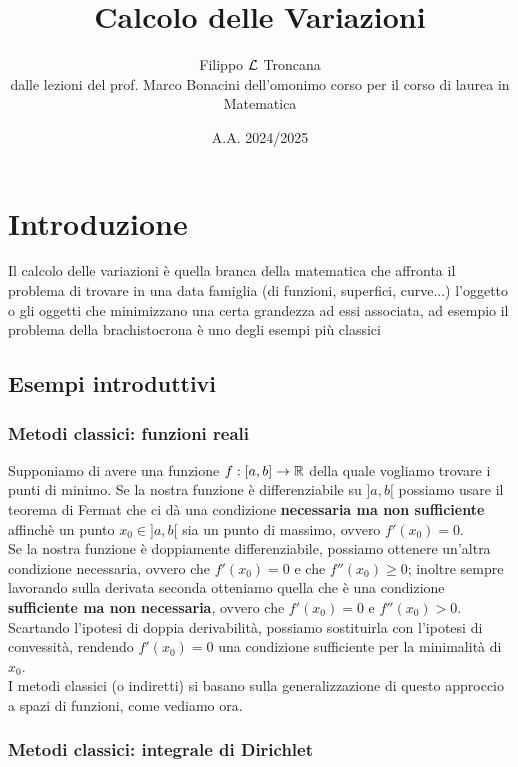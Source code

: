 \documentclass[openany]{book}
\title{Calcolo delle Variazioni}
\author{Filippo $\mathcal{L}$ Troncana\\dalle lezioni del prof. Marco Bonacini dell'omonimo corso per il corso di laurea in Matematica}
\date{A.A. 2024/2025}
\begin{document}
\maketitle

\tableofcontents

\pagebreak


\section*{Introduzione}

Il calcolo delle variazioni è quella branca della matematica che affronta il problema di trovare in una data famiglia (di funzioni, superfici, curve...) l'oggetto o gli oggetti che minimizzano una certa grandezza ad essi associata, ad esempio il problema della brachistocrona è uno degli esempi più classici

\subsection*{Esempi introduttivi}

\subsubsection*{Metodi classici: funzioni reali}

Supponiamo di avere una funzione $f:[a,b]\to\mathbb{R}$ della quale vogliamo trovare i punti di minimo. Se la nostra funzione è differenziabile su $]a,b[$ possiamo usare il teorema di Fermat che ci dà una condizione \textbf{necessaria ma non sufficiente} affinchè un punto $x_0 \in ]a,b[$ sia un punto di massimo, ovvero $f'(x_0) = 0$.\\
Se la nostra funzione è doppiamente differenziabile, possiamo ottenere un'altra condizione necessaria, ovvero che $f'(x_0) = 0$ e che $f''(x_0) \ge 0$; inoltre sempre lavorando sulla derivata seconda otteniamo quella che è una condizione \textbf{sufficiente ma non necessaria}, ovvero che $f'(x_0) = 0$ e $f''(x_0) > 0$.\\
Scartando l'ipotesi di doppia derivabilità, possiamo sostituirla con l'ipotesi di convessità, rendendo $f'(x_0) = 0$ una condizione sufficiente per la minimalità di $x_0$.\\
I metodi classici (o indiretti) si basano sulla generalizzazione di questo approccio a spazi di funzioni, come vediamo ora.

\subsubsection*{Metodi classici: integrale di Dirichlet}
\end{document}

